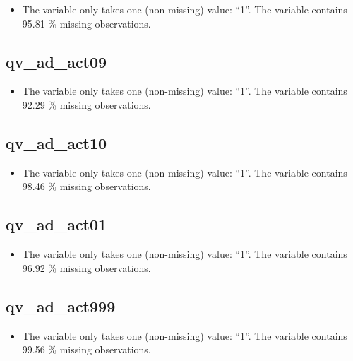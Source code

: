 \documentclass[
  letterpaper,
  DIV=11,
  numbers=noendperiod]{scrartcl}
\providecommand{\tightlist}{%
  \setlength{\itemsep}{0pt}\setlength{\parskip}{0pt}}
\begin{document}
\begin{itemize}
\tightlist
\item
  The variable only takes one (non-missing) value: ``1''. The variable
  contains 95.81 \% missing observations.
\end{itemize}

\fullline

\subsection{qv\_ad\_act09}\label{qv_ad_act09}

\begin{itemize}
\tightlist
\item
  The variable only takes one (non-missing) value: ``1''. The variable
  contains 92.29 \% missing observations.
\end{itemize}

\fullline

\subsection{qv\_ad\_act10}\label{qv_ad_act10}

\begin{itemize}
\tightlist
\item
  The variable only takes one (non-missing) value: ``1''. The variable
  contains 98.46 \% missing observations.
\end{itemize}

\fullline

\subsection{qv\_ad\_act01}\label{qv_ad_act01}

\begin{itemize}
\tightlist
\item
  The variable only takes one (non-missing) value: ``1''. The variable
  contains 96.92 \% missing observations.
\end{itemize}

\fullline

\subsection{qv\_ad\_act999}\label{qv_ad_act999}

\begin{itemize}
\tightlist
\item
  The variable only takes one (non-missing) value: ``1''. The variable
  contains 99.56 \% missing observations.
\end{itemize}
\end{document}
